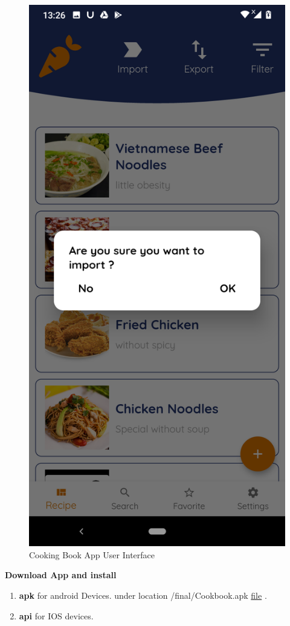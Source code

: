 \documentclass{article}
\begin{document}
\begin{figure}[h!]
    \includegraphics[scale=0.1]{Images/Import_annouce.jpg}
    \caption{Cooking Book App User Interface}
    \label{fig:cookingbook}
\end{figure}
\textbf{Download App and install}  \\
\begin{enumerate}
        \item \textbf{apk} for android Devices. under location /final/Cookbook.apk \href{/final/Cookbook.apk}{file} .
        \item \textbf{api} for IOS devices.
\end{enumerate}
\end{document}
